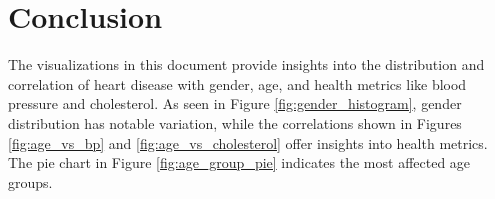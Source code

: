 \documentclass{article}
\begin{document}
	\section{Conclusion}
	The visualizations in this document provide insights into the distribution and correlation of heart disease with gender, age, and health metrics like blood pressure and cholesterol. As seen in Figure \ref{fig:gender_histogram}, gender distribution has notable variation, while the correlations shown in Figures \ref{fig:age_vs_bp} and \ref{fig:age_vs_cholesterol} offer insights into health metrics. The pie chart in Figure \ref{fig:age_group_pie} indicates the most affected age groups.
	
\end{document}
